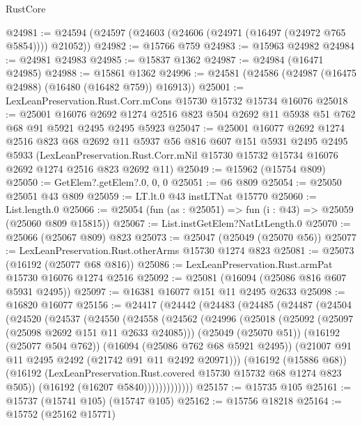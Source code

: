 \begin{lexlean}{RustCore}
\begin{coremodule}
@24981 := @24594 (@24597 (@24603 (@24606 (@24971 (@16497 (@24972 @765 @5854)))) @21052))
@24982 := @15766 @759
@24983 := @15963 @24982
@24984 := @24981 @24983
@24985 := @15837 @1362
@24987 := @24984 (@16471 @24985)
@24988 := @15861 @1362
@24996 := @24581 (@24586 (@24987 (@16475 @24988) (@16480 (@16482 @759)) @16913))
@25001 := LexLeanPreservation.Rust.Corr.mCons @15730 @15732 @15734 @16076
@25018 := @25001
    @16076
    @2692
    @1274
    @2516
    @823
    @504
    @2692
    @11
    @5938
    @51
    @762
    @68
    @91
    @5921
    @2495
    @2495
    @5923
@25047 := @25001
    @16077
    @2692
    @1274
    @2516
    @823
    @68
    @2692
    @11
    @5937
    @56
    @816
    @607
    @151
    @5931
    @2495
    @2495
    @5933
    (LexLeanPreservation.Rust.Corr.mNil
      @15730
      @15732
      @15734
      @16076
      @2692
      @1274
      @2516
      @823
      @2692
      @11)
@25049 := @15962 (@15754 @809)
@25050 := GetElem?.getElem?.{0, 0, 0}
@25051 := @6 @809
@25054 := @25050 @25051 @43 @809
@25059 := LT.lt.{0} @43 instLTNat @15770
@25060 := List.length.{0}
@25066 := @25054 (fun (as : @25051) => fun (i : @43) => @25059 (@25060 @809 @15815))
@25067 := List.instGetElem?NatLtLength.{0}
@25070 := @25066 (@25067 @809) @823
@25073 := @25047 (@25049 (@25070 @56))
@25077 := LexLeanPreservation.Rust.otherArms @15730 @1274 @823
@25081 := @25073 (@16192 (@25077 @68 @816))
@25086 := LexLeanPreservation.Rust.armPat @15730 @16076 @1274 @2516
@25092 := @25081 (@16094 (@25086 @816 @607 @5931 @2495))
@25097 := @16381 @16077 @151 @11 @2495 @2633
@25098 := @16820 @16077
@25156 := @24417
    (@24442
      (@24483
        (@24485
          (@24487
            (@24504
              (@24520
                (@24537
                  (@24550
                    (@24558
                      (@24562
                        (@24996
                          (@25018
                            (@25092 (@25097 (@25098 @2692 @151 @11 @2633 @24085)))
                            (@25049 (@25070 @51))
                            (@16192 (@25077 @504 @762))
                            (@16094 (@25086 @762 @68 @5921 @2495))
                            (@21007 @91 @11 @2495 @2492 (@21742 @91 @11 @2492 @20971)))
                          (@16192 (@15886 @68))
                          (@16192
                            (LexLeanPreservation.Rust.covered @15730 @15732 @68 @1274 @823 @505))
                          (@16192 (@16207 @5840)))))))))))))
@25157 := @15735 @105
@25161 := @15737 (@15741 @105) (@15747 @105)
@25162 := @15756 @18218
@25164 := @15752 (@25162 @15771)

\end{coremodule}
\end{lexlean}
